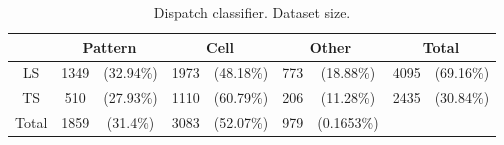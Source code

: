 \begin{table}
	\small
	\center
	\begin{tabular}{|c|cc|cc|cc|cc|}
		\hline
		& \multicolumn{2}{|c|}{Pattern} & \multicolumn{2}{c|}{Cell} & \multicolumn{2}{c|}{Other} & \multicolumn{2}{c|}{Total}\\
		\hline		
		LS & 1349 & \tiny (32.94\%) & 1973 & \tiny (48.18\%) & 773 & \tiny (18.88\%) & 4095 & \tiny (69.16\%)\\
		TS & 510 & \tiny (27.93\%) & 1110 & \tiny (60.79\%) & 206 & \tiny (11.28\%) & 2435 & \tiny (30.84\%)\\
		\hline		
		Total & 1859 & \tiny (31.4\%) & 3083 & \tiny (52.07\%) & 979 & \tiny (0.1653\%) & \multicolumn{2}{c|}{}\\
		\hline
	\end{tabular}
	\caption{Dispatch classifier. Dataset size.}
	\label{tab:dispatch_classif_dataset_size}
\end{table}

